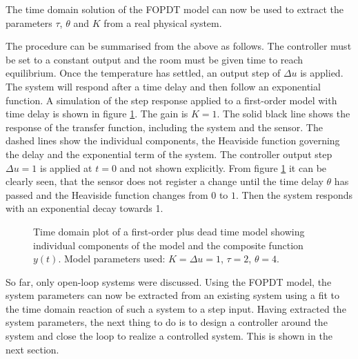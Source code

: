The time domain solution of the FOPDT model can now be used to extract the parameters $\tau$, $\theta$ and $K$ from a real physical system.

The procedure can be summarised from the above as follows. The controller must be set to a constant output and the room must be given time to reach equilibrium. Once the temperature has settled, an output step of $\Delta u$ is applied. The system will respond after a time delay and then follow an exponential function. A simulation of the step response applied to a first-order model with time delay is shown in figure \ref{fig:fopdt}. The gain is $K=1$. The solid black line shows the response of the transfer function, including the system and the sensor. The dashed lines show the individual components, the Heaviside function governing the delay and the exponential term of the system. The controller output step $\Delta u = 1$ is applied at $t=0$ and not shown explicitly. From figure \ref{fig:fopdt} it can be clearly seen, that the sensor does not register a change until the time delay $\theta$ has passed and the Heaviside function changes from $0$ to $1$. Then the system responds with an exponential decay towards \num{1}.

\begin{figure}[ht]
    \centering
    
    \caption{Time domain plot of a first-order plus dead time model showing individual components of the model and the composite function $y(t)$. Model parameters used: $K= \Delta u = 1$, $\tau=2$, $\theta=4$.}
    \label{fig:fopdt}
\end{figure}

So far, only open-loop systems were discussed. Using the FOPDT model, the system parameters can now be extracted from an existing system using a fit to the time domain reaction of such a system to a step input. Having extracted the system parameters, the next thing to do is to design a controller around the system and close the loop to realize a controlled system. This is shown in the next section.

